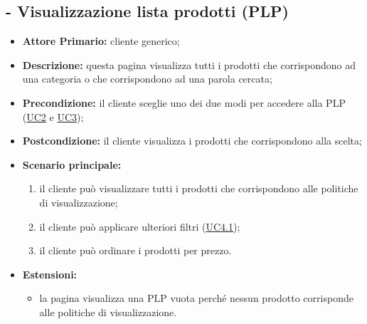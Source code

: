\subsection{ - Visualizzazione lista prodotti (PLP)}
\begin{itemize}
    \item \textbf{Attore Primario:} cliente generico;
    \item \textbf{Descrizione:} questa pagina visualizza tutti i prodotti che corrispondono ad una categoria o che corrispondono ad una parola cercata;
    \item \textbf{Precondizione:} il cliente sceglie uno dei due modi per accedere alla PLP (\hyperref[UC2]{UC2} e \hyperref[UC3]{UC3});
    \item \textbf{Postcondizione:} il cliente visualizza i prodotti che corrispondono alla scelta;
    \item \textbf{Scenario principale:}
          \begin{enumerate}
              \item il cliente può visualizzare tutti i prodotti che corrispondono alle politiche di visualizzazione;
              \item il cliente può applicare ulteriori filtri (\hyperref[UC4.1]{UC4.1});
              \item il cliente può ordinare i prodotti per prezzo.
          \end{enumerate}
    \item \textbf{Estensioni:}
          \begin{itemize}
              \item la pagina visualizza una PLP vuota perché nessun prodotto corrisponde alle politiche di visualizzazione.
          \end{itemize}
\end{itemize}

\stepsubUserCase
